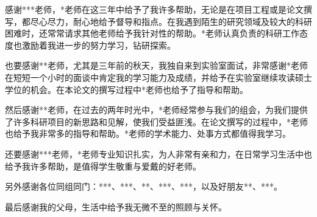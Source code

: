 \documentclass[promaster]{thesis-uestc}
\begin{document}
感谢***老师，*老师在这三年中给予了我许多帮助，无论是在项目工程或是论文撰写，都尽心尽力，耐心地给予督导和指点。在我遇到陌生的研究领域及较大的科研困难时，还常常请求其他老师给予我针对性的帮助。*老师认真负责的科研工作态度也激励着我进一步的努力学习，钻研探索。

也要感谢**老师，尤其是三年前的秋天，我独自来到实验室面试，非常感谢*老师在短短一个小时的面谈中肯定我的学习能力及成绩，并给予在实验室继续攻读硕士学位的机会。在本论文的撰写过程中*老师也给予了指导和帮助。

然后感谢**老师，在过去的两年时光中，*老师经常参与我们的组会，为我们提供了许多科研项目的新思路和见解，使我们受益匪浅。在论文撰写的过程中，*老师也给予我非常多的指导和帮助。*老师的学术能力、处事方式都值得我学习。

还要感谢***老师，*老师专业知识扎实，为人非常有亲和力，在日常学习生活中也给予我许多帮助，是值得学生敬重与爱戴的好老师。

另外感谢各位同组同门：***、***、**、***、***，以及好朋友**、***。

最后感谢我的父母，生活中给予我无微不至的照顾与关怀。


\nocite{*}

%
% 
%
% 
% 
%


\end{document}
